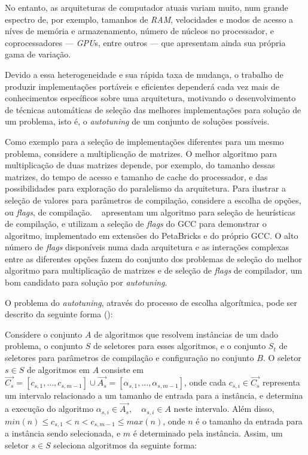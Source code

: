 \documentclass[a4paper, 11pt]{article}
\begin{document}
No entanto, as arquiteturas de computador atuais variam muito, num grande 
espectro de, por exemplo, tamanhos de \emph{RAM},
velocidades e modos de acesso a níves de memória e armazenamento, número de 
núcleos no processador, e coprocessadores --- \emph{GPU}s, entre outros 
--- que apresentam ainda sua própria gama de variação.

Devido a essa heterogeneidade e sua rápida taxa de mudança, 
o trabalho de produzir implementações portáveis e eficientes 
dependerá cada vez mais de conhecimentos específicos sobre uma arquitetura,
motivando o desenvolvimento de técnicas automáticas de seleção das melhores
implementações para solução de um problema, isto é, o \emph{autotuning} de um
conjunto de soluções possíveis.

Como exemplo para a seleção de implementações diferentes para um mesmo
problema, considere a multiplicação de matrizes. O melhor algoritmo
para multiplicação de duas matrizes depende, por exemplo, do tamanho dessas
matrizes, do tempo de acesso e tamanho de cache do processador, e das 
possibilidades para exploração do paralelismo da arquitetura.
Para ilustrar a seleção de valores para parâmetros de compilação, considere
a escolha de opções, ou \emph{flags}, de compilação.
~\citet{tartara2013heuristics} apresentam um algoritmo para seleção de 
heurísticas de compilação, e utilizam a seleção de \emph{flags}
do GCC para demonstrar o algoritmo, implementado em extensões do PetaBricks e 
do próprio GCC. 
O alto número de \emph{flags} disponíveis numa dada arquitetura e as interações
complexas entre as diferentes opções fazem do conjunto dos problemas de 
seleção do melhor algoritmo para multiplicação de matrizes e de seleção de 
\emph{flags} de compilador, um bom candidato para solução por 
\emph{autotuning}.

O problema do \emph{autotuning}, através do processo de escolha algorítmica,
pode ser descrito da seguinte forma (\citet{ansel2011efficient}):

Considere o conjunto $A$ de algoritmos que resolvem instâncias de um dado 
problema, o conjunto $S$ de seletores para esses algoritmos, e o conjunto $S_t$
de seletores para parâmetros de compilação e configuração no conjunto $B$.
O seletor $s \in S$ de algoritmos em $A$ consiste em 
$\overrightarrow{C_s} = [c_{s,1},\dots,c_{s,m-1}] \cup \overrightarrow{A_s} = 
[\alpha_{s,1},\dots,\alpha_{s,m-1}]$,
onde cada $c_{s,i} \in \overrightarrow{C_s}$ representa um intervalo 
relacionado a um tamanho de entrada para a instância, e 
determina a execução do algoritmo $\alpha_{s,i} \in \overrightarrow{A_s}, 
\quad \alpha_{s,i} \in A$ neste intervalo. 
Além disso, $min(n) \leq c_{s,1} < n < c_{s,m-1} \leq max(n)$,
onde $n$ é o tamanho da entrada para a instância sendo selecionada, e $m$ 
é determinado pela instância.
Assim, um seletor $s \in S$ seleciona algoritmos da seguinte forma:
\end{document}
